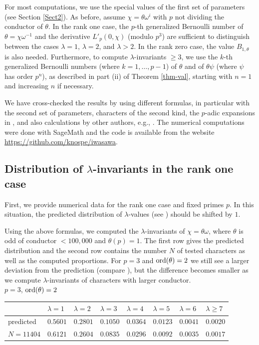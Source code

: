 \documentclass[pdflatex,sn-mathphys-num]{sn-jnl}%
\theoremstyle{plain}
\theoremstyle{definition}
\theoremstyle{remark}
\numberwithin{equation}{section}
\newcommand{\ord}{\text{\rm ord}}
\begin{document}
For most computations, we use the special values of the first set of parameters (see Section \ref{Sect2}).  As before, assume $\chi = \theta \omega^i$ with $p$ not dividing the conductor of $\theta$.  In the rank one case, the $p$-th generalized Bernoulli number of $\theta = \chi \omega^{-1} $ and the derivative $L'_p(0,\chi)$  (modulo $p^3$) are sufficient to distinguish between the cases $\lambda=1$, $\lambda=2$, and $\lambda >2$. In the rank zero case, the value $B_{1,\theta}$ is also needed. Furthermore, to compute $\lambda$-invariants $\geq 3$, we use the $k$-th generalized Bernoulli numbers (where $k=1,\dots,p-1$) of $\theta$ and of $\theta \psi$ (where $\psi$ has order $p^n$), as described in part (ii) of Theorem \ref{thm-val}, starting with $n=1$ and increasing $n$ if necessary.

 We have cross-checked the results by using different formulas, in particular with the second set of parameters, characters of the second kind, the $p$-adic expansions in \cite{KnWa}, and also calculations by other authors, e.g., \cite{Du}. The numerical computations were done with SageMath and the code is available from the website
\url{https://github.com/knospe/iwasawa}. 


\subsection{Distribution of $\lambda$-invariants in the rank one case}
\label{Sect41}
First, we provide numerical data for the rank one case and fixed primes $p$. In this situation, the predicted distribution of $\lambda$-values (see \cite{DeKn}) should be shifted by $1$. 

Using the above formulas, we computed the $\lambda$-invariants of $\chi = \theta \omega$, where $\theta$ is odd of conductor $<100,000$ and $\theta(p)=1$. The first row gives the predicted distribution and the second row contains the number $N$ of tested characters as well as the computed proportions. For $p=3$ and $\ord(\theta)=2$ we still see a larger deviation from the prediction (compare \cite{DeKn}), but the difference becomes smaller as we compute $\lambda$-invariants of characters with larger conductor. \\

\noindent $p=3$, $\ord(\theta)=2$\\
\begin{tabular}{|l|l|l|l|l|l|l|l|} \hline
& $\lambda=1$ & $\lambda=2$ & $\lambda=3$ & $\lambda=4$ & $\lambda=5$ & $\lambda=6$ & $\lambda\geq 7$ \\ \hline
predicted & $0.5601$ & $0.2801$ & $0.1050$ & $0.0364$ & $0.0123$ & $0.0041$ & $0.0020$ \\ \hline
$N=11404$ & $0.6121$ & $0.2604$ & $0.0835$ & $0.0296$ & $0.0092$ & $0.0035$ & $0.0017$ \\ \hline
\end{tabular}\\
\end{document}
